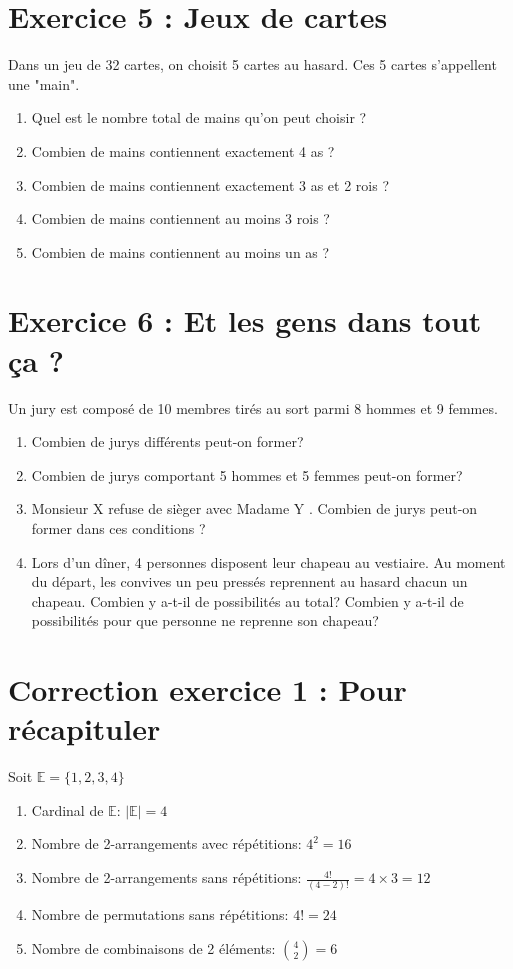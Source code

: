 \section*{Exercice 5 : Jeux de cartes}
Dans un jeu de 32 cartes, on choisit 5 cartes au hasard. Ces 5 cartes s'appellent une "main".

\begin{enumerate}
    \item Quel est le nombre total de mains qu'on peut choisir ?
    \item Combien de mains contiennent exactement 4 as ?
    \item Combien de mains contiennent exactement 3 as et 2 rois ?
    \item Combien de mains contiennent au moins 3 rois ?
    \item Combien de mains contiennent au moins un as ?
\end{enumerate}
 
\section*{Exercice 6 : Et les gens dans tout ça ?}

Un jury est composé de 10 membres tirés au sort parmi 8 hommes et 9 femmes.

\begin{enumerate}
\item Combien de jurys différents peut-on former?
\item Combien de jurys comportant 5 hommes et 5 femmes peut-on former?
\item Monsieur X refuse de sièger avec Madame Y . Combien de jurys peut-on former dans ces conditions ?
\item Lors d'un dîner, 4 personnes disposent leur chapeau au vestiaire. Au moment du départ, les convives un peu pressés reprennent au hasard chacun un chapeau. Combien y a-t-il de possibilités au total? Combien y a-t-il de possibilités pour que personne ne reprenne son chapeau?
\end{enumerate}


\section*{Correction exercice 1 : Pour récapituler}

Soit \(\mathbb{E}=\{1,2,3,4\}\)

\begin{enumerate}
    \item Cardinal de \(\mathbb{E}\): \(|\mathbb{E}| = 4\)
    \item Nombre de 2-arrangements avec répétitions: \(4^2 = 16\)
    \item Nombre de 2-arrangements sans répétitions: \(\frac{4!}{(4-2)!} = 4 \times 3 = 12\)
    \item Nombre de permutations sans répétitions: \(4! = 24\)
    \item Nombre de combinaisons de 2 éléments: \(\binom{4}{2} = 6\)
\end{enumerate}

